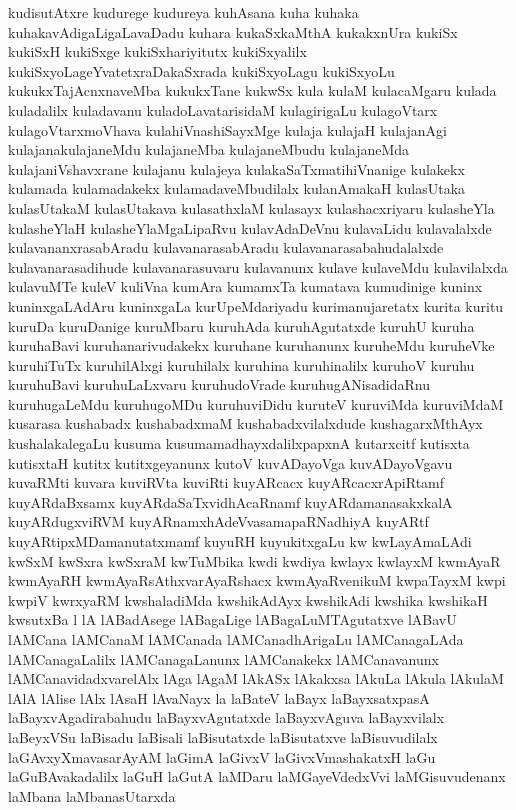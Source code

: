 {kudisutAtxre
kudurege
kudureya
kuhAsana
kuha
kuhaka
kuhakavAdigaLigaLavaDadu
kuhara
kukaSxkaMthA
kukakxnUra
kukiSx
kukiSxH
kukiSxge
kukiSxhariyitutx
kukiSxyalilx
kukiSxyoLageYvatetxraDakaSxrada
kukiSxyoLagu
kukiSxyoLu
kukukxTajAcnxnaveMba
kukukxTane
kukwSx
kula
kulaM
kulacaMgaru
kulada
kuladalilx
kuladavanu
kuladoLavatarisidaM
kulagirigaLu
kulagoVtarx
kulagoVtarxmoVhava
kulahiVnashiSayxMge
kulaja
kulajaH
kulajanAgi
kulajanakulajaneMdu
kulajaneMba
kulajaneMbudu
kulajaneMda
kulajaniVshavxrane
kulajanu
kulajeya
kulakaSaTxmatihiVnanige
kulakekx
kulamada
kulamadakekx
kulamadaveMbudilalx
kulanAmakaH
kulasUtaka
kulasUtakaM
kulasUtakava
kulasathxlaM
kulasayx
kulashacxriyaru
kulasheYla
kulasheYlaH
kulasheYlaMgaLipaRvu
kulavAdaDeVnu
kulavaLidu
kulavalalxde
kulavananxrasabAradu
kulavanarasabAradu
kulavanarasabahudalalxde
kulavanarasadihude
kulavanarasuvaru
kulavanunx
kulave
kulaveMdu
kulavilalxda
kulavuMTe
kuleV
kuliVna
kumAra
kumamxTa
kumatava
kumudinige
kuninx
kuninxgaLAdAru
kuninxgaLa
kurUpeMdariyadu
kurimanujaretatx
kurita
kuritu
kuruDa
kuruDanige
kuruMbaru
kuruhAda
kuruhAgutatxde
kuruhU
kuruha
kuruhaBavi
kuruhanarivudakekx
kuruhane
kuruhanunx
kuruheMdu
kuruheVke
kuruhiTuTx
kuruhilAlxgi
kuruhilalx
kuruhina
kuruhinalilx
kuruhoV
kuruhu
kuruhuBavi
kuruhuLaLxvaru
kuruhudoVrade
kuruhugANisadidaRnu
kuruhugaLeMdu
kuruhugoMDu
kuruhuviDidu
kuruteV
kuruviMda
kuruviMdaM
kusarasa
kushabadx
kushabadxmaM
kushabadxvilalxdude
kushagarxMthAyx
kushalakalegaLu
kusuma
kusumamadhayxdalilxpapxnA
kutarxcitf
kutisxta
kutisxtaH
kutitx
kutitxgeyanunx
kutoV
kuvADayoVga
kuvADayoVgavu
kuvaRMti
kuvara
kuviRVta
kuviRti
kuyARcacx
kuyARcacxrApiRtamf
kuyARdaBxsamx
kuyARdaSaTxvidhAcaRnamf
kuyARdamanasakxkalA
kuyARdugxviRVM
kuyARnamxhAdeVvasamapaRNadhiyA
kuyARtf
kuyARtipxMDamanutatxmamf
kuyuRH
kuyukitxgaLu
kw
kwLayAmaLAdi
kwSxM
kwSxra
kwSxraM
kwTuMbika
kwdi
kwdiya
kwlayx
kwlayxM
kwmAyaR
kwmAyaRH
kwmAyaRsAthxvarAyaRshacx
kwmAyaRvenikuM
kwpaTayxM
kwpi
kwpiV
kwrxyaRM
kwshaladiMda
kwshikAdAyx
kwshikAdi
kwshika
kwshikaH
kwsutxBa
l
lA
lABadAsege
lABagaLige
lABagaLuMTAgutatxve
lABavU
lAMCana
lAMCanaM
lAMCanada
lAMCanadhArigaLu
lAMCanagaLAda
lAMCanagaLalilx
lAMCanagaLanunx
lAMCanakekx
lAMCanavanunx
lAMCanavidadxvarelAlx
lAga
lAgaM
lAkASx
lAkakxsa
lAkuLa
lAkula
lAkulaM
lAlA
lAlise
lAlx
lAsaH
lAvaNayx
la
laBateV
laBayx
laBayxsatxpasA
laBayxvAgadirabahudu
laBayxvAgutatxde
laBayxvAguva
laBayxvilalx
laBeyxVSu
laBisadu
laBisali
laBisutatxde
laBisutatxve
laBisuvudilalx
laGAvxyXmavasarAyAM
laGimA
laGivxV
laGivxVmashakatxH
laGu
laGuBAvakadalilx
laGuH
laGutA
laMDaru
laMGayeVdedxVvi
laMGisuvudenanx
laMbana
laMbanasUtarxda
}
